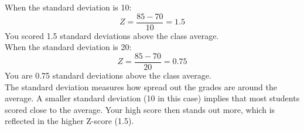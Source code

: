 \documentclass{./../handout}
\begin{document}
\begin{enumerate}
When the standard deviation is 10:
$$ Z = \frac{85-70}{10} = 1.5   $$
You scored 1.5 standard deviations above the class average. \\

When the standard deviation is 20:
$$ Z = \frac{85-70}{20} = 0.75   $$
You are 0.75 standard deviations above the class average. \\

The standard deviation measures how spread out the grades are around the average. A smaller standard deviation (10 in this case) implies that most students scored close to the average. Your high score then stands out more, which is reflected in the higher Z-score (1.5).
\end{enumerate}
\end{document}
